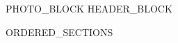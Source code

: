 \documentclass[letterpaper,12pt]{article}
\begin{document}
\begin{center}
{{PHOTO_BLOCK}}
{{HEADER_BLOCK}}
\end{center}
\vspace{-8pt}
{{ORDERED_SECTIONS}}
\end{document}
